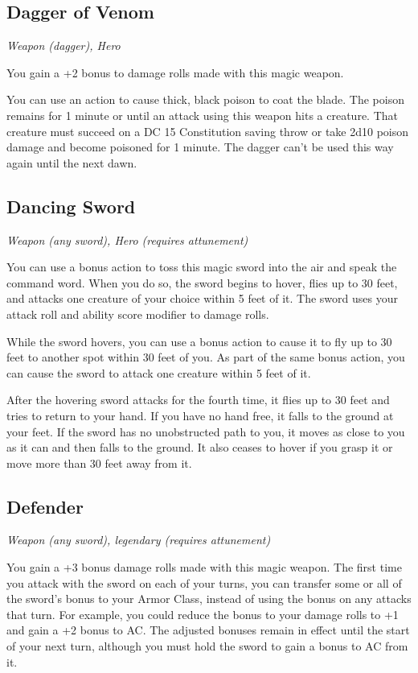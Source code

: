 \subsection{Dagger of Venom}
\textit{Weapon (dagger), Hero}

You gain a +2 bonus to damage rolls made with this magic weapon.

You can use an action to cause thick, black poison to coat the blade. The poison remains for 1 minute or until an attack using this weapon hits a creature. That creature must succeed on a DC 15 Constitution saving throw or take 2d10 poison damage and become poisoned for 1 minute. The dagger can't be used this way again until the next dawn.

\subsection{Dancing Sword}
\textit{Weapon (any sword), Hero (requires attunement)}

You can use a bonus action to toss this magic sword into the air and speak the command word. When you do so, the sword begins to hover, flies up to 30 feet, and attacks one creature of your choice within 5 feet of it. The sword uses your attack roll and ability score modifier to damage rolls.

While the sword hovers, you can use a bonus action to cause it to fly up to 30 feet to another spot within 30 feet of you. As part of the same bonus action, you can cause the sword to attack one creature within 5 feet of it.

After the hovering sword attacks for the fourth time, it flies up to 30 feet and tries to return to your hand. If you have no hand free, it falls to the ground at your feet. If the sword has no unobstructed path to you, it moves as close to you as it can and then falls to the ground. It also ceases to hover if you grasp it or move more than 30 feet away from it.

\subsection{Defender}
\textit{Weapon (any sword), legendary (requires attunement)}

You gain a +3 bonus damage rolls made with this magic weapon. The first time you attack with the sword on each of your turns, you can transfer some or all of the sword's bonus to your Armor Class, instead of using the bonus on any attacks that turn. For example, you could reduce the bonus to your damage rolls to +1 and gain a +2 bonus to AC. The adjusted bonuses remain in effect until the start of your next turn, although you must hold the sword to gain a bonus to AC from it.

